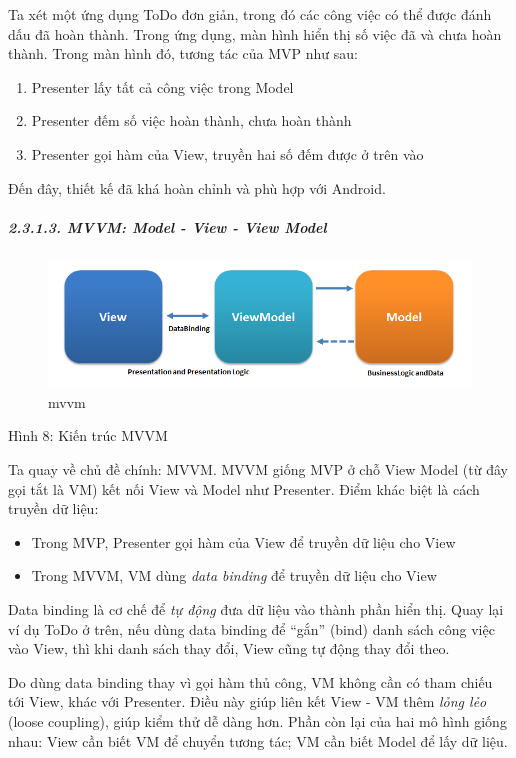 \documentclass[
]{article}
\begin{document}
Ta xét một ứng dụng ToDo đơn giản, trong đó các công việc có thể được
đánh dấu đã hoàn thành. Trong ứng dụng, màn hình hiển thị số việc đã và
chưa hoàn thành. Trong màn hình đó, tương tác của MVP như sau:

\begin{enumerate}
\def\labelenumi{\arabic{enumi}.}
\item
  Presenter lấy tất cả công việc trong Model
\item
  Presenter đếm số việc hoàn thành, chưa hoàn thành
\item
  Presenter gọi hàm của View, truyền hai số đếm được ở trên vào
\end{enumerate}

Đến đây, thiết kế đã khá hoàn chỉnh và phù hợp với Android.

\hypertarget{mvvm-model---view---view-model}{%
\subparagraph{2.3.1.3. MVVM: Model - View - View
Model}\label{mvvm-model---view---view-model}}

\begin{figure}
\centering
\includegraphics{../images/MVVMPattern.png}
\caption{mvvm}
\end{figure}

Hình 8: Kiến trúc MVVM

Ta quay về chủ đề chính: MVVM. MVVM giống MVP ở chỗ View Model (từ đây
gọi tắt là VM) kết nối View và Model như Presenter. Điểm khác biệt là
cách truyền dữ liệu:

\begin{itemize}
\item
  Trong MVP, Presenter gọi hàm của View để truyền dữ liệu cho View
\item
  Trong MVVM, VM dùng \emph{data binding} để truyền dữ liệu cho View
\end{itemize}

Data binding là cơ chế để \emph{tự động} đưa dữ liệu vào thành phần hiển
thị. Quay lại ví dụ ToDo ở trên, nếu dùng data binding để ``gắn'' (bind)
danh sách công việc vào View, thì khi danh sách thay đổi, View cũng tự
động thay đổi theo.

Do dùng data binding thay vì gọi hàm thủ công, VM không cần có tham
chiếu tới View, khác với Presenter. Điều này giúp liên kết View - VM
thêm \emph{lỏng lẻo} (loose coupling), giúp kiểm thử dễ dàng hơn. Phần
còn lại của hai mô hình giống nhau: View cần biết VM để chuyển tương
tác; VM cần biết Model để lấy dữ liệu.
\end{document}
